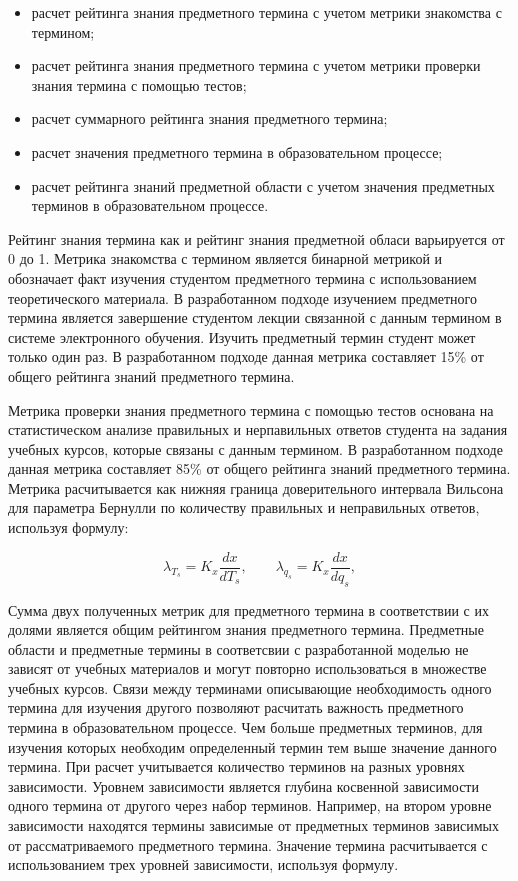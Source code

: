 \begin{itemize}
\item расчет рейтинга знания предметного термина с учетом метрики знакомства с термином;
\item расчет рейтинга знания предметного термина с учетом метрики проверки знания термина с помощью тестов;
\item расчет суммарного рейтинга знания предметного термина;
\item расчет значения предметного термина в образовательном процессе;
\item расчет рейтинга знаний предметной области с учетом значения предметных терминов в образовательном процессе.
\end{itemize}

Рейтинг знания термина как и рейтинг знания предметной обласи варьируется от 0 до 1. Метрика знакомства с термином является бинарной метрикой и обозначает факт изучения студентом предметного термина с использованием теоретического материала. В разработанном подходе изучением предметного термина является завершение студентом лекции связанной с данным термином в системе электронного обучения. Изучить предметный термин студент может только один раз. В разработанном подходе данная метрика составляет 15\% от общего рейтинга знаний предметного термина.

Метрика проверки знания предметного термина с помощью тестов основана на статистическом анализе правильных и нерпавильных ответов студента на задания учебных курсов, которые связаны с данным термином. В разработанном подходе данная метрика составляет 85\% от общего рейтинга знаний предметного термина. Метрика расчитывается как нижняя граница доверительного интервала Вильсона для параметра Бернулли по количеству правильных и неправильных ответов, используя формулу:

$$
  \lambda_{T_s} = K_x\frac{d{x}}{d{T_s}}, \qquad
  \lambda_{q_s} = K_x\frac{d{x}}{d{q_s}},
$$

Сумма двух полученных метрик для предметного термина в соответствии с их долями является общим рейтингом знания предметного термина. Предметные области и предметные термины в соответсвии с разработанной моделью не зависят от учебных материалов и могут повторно использоваться в множестве учебных курсов. Связи между терминами описывающие необходимость одного термина для изучения другого позволяют расчитать важность предметного термина в образовательном процессе. Чем больше предметных терминов, для изучения которых необходим определенный термин тем выше значение данного термина. При расчет учитывается количество терминов на разных уровнях зависимости. Уровнем зависимости является глубина косвенной зависимости одного термина от другого через набор терминов. Например, на втором уровне зависимости находятся термины зависимые от предметных терминов зависимых от рассматриваемого предметного термина. Значение термина расчитывается с использованием трех уровней зависимости, используя формулу. 

